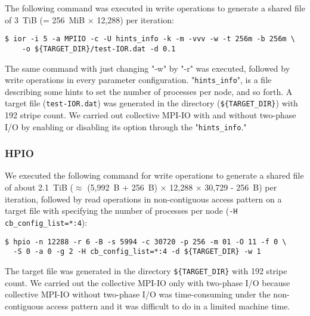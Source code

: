 \documentclass{jhps}
\begin{document}
The following command was executed in write operations to generate
a shared file of 3~TiB (= 256~MiB $\times$ 12,288) per iteration:
%
\begin{verbatim}
$ ior -i 5 -a MPIIO -c -U hints_info -k -m -vvv -w -t 256m -b 256m \
    -o ${TARGET_DIR}/test-IOR.dat -d 0.1
\end{verbatim}
%
The same command with just changing "-w" by "-r" was executed,
followed by write operations in every parameter configuration.
"{\tt hints\_info}", is a file describing some hints to set the number of processes per node,
and so forth.
A target file ({\tt test-IOR.dat}) was generated in the directory
({\tt \$\{TARGET\_DIR\}})
with 192 stripe count.
We carried out collective MPI-IO with and without two-phase I/O by enabling
or disabling its option through the "{\tt hints\_info}."
%
%

\subsubsection{HPIO}

We executed the following command for write operations to generate
a shared file of about 2.1~TiB ($\approx$ (5,992~B + 256~B) $\times$ 12,288 $\times$ 30,729 - 256~B)
per iteration, followed by read operations in non-contiguous access pattern
on a target file with specifying the number of processes per node ({\tt -H cb\_config\_list=*:4}):
%
\begin{verbatim}
$ hpio -n 12288 -r 6 -B -s 5994 -c 30720 -p 256 -m 01 -O 11 -f 0 \
  -S 0 -a 0 -g 2 -H cb_config_list=*:4 -d ${TARGET_DIR} -w 1
\end{verbatim}
%
The target file was generated in the directory {\tt \$\{TARGET\_DIR\}}
with 192 stripe count. We carried out the collective MPI-IO
only with two-phase I/O because collective MPI-IO without two-phase I/O was
time-consuming under the non-contiguous access pattern and
it was difficult to do in a limited machine time.
\end{document}
